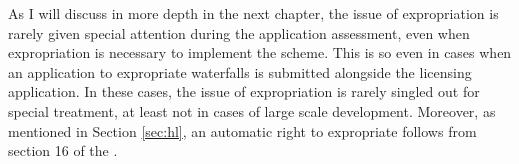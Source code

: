 %

As I will discuss in more depth in the next chapter, the issue of expropriation is rarely given special attention during the application assessment, even when expropriation is necessary to implement the scheme. This is so even in cases when an application to expropriate waterfalls is submitted alongside the licensing application. In these cases, the issue of expropriation is rarely singled out for special treatment, at least not in cases of large scale development. Moreover, as mentioned in Section \ref{sec:hl}, an automatic right to expropriate follows from section 16 of the \cite{wra17}. 

